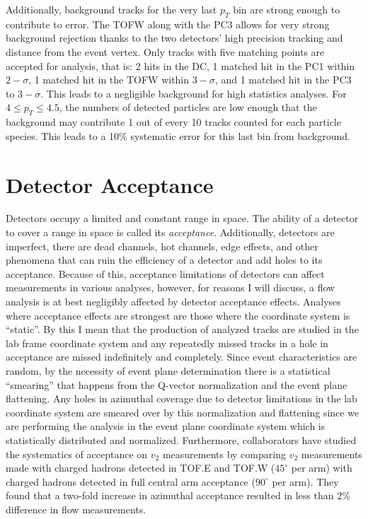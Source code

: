 Additionally, background tracks for the very last $p_T$ bin are strong enough to contribute to error. The TOFW along with the PC3 allows for very strong background rejection thanks to the two detectors' high precision tracking and distance from the event vertex. Only tracks with five matching points are accepted for analysis, that is: 2 hits in the DC, 1 matched hit in the PC1 within $2-\sigma$, 1 matched hit in the TOFW within $3-\sigma$, and 1 matched hit in the PC3 to $3-\sigma$. This leads to a negligible background for high statistics analyses. For $4\leq p_T \leq4.5$, the numbers of detected particles are low enough that the background may contribute 1 out of every 10 tracks counted for each particle species. This leads to a 10\% systematic error for this last bin from background.

\section{Detector Acceptance}
\label{sectaccepterr}
Detectors occupy a limited and constant range in space. The ability of a detector to cover a range in space is called its \textit{acceptance}. Additionally, detectors are imperfect, there are dead channels, hot channels, edge effects, and other phenomena that can ruin the efficiency of a detector and add holes to its acceptance. Because of this, acceptance limitations of detectors can affect measurements in various analyses, however, for reasons I will discuss, a flow analysis is at best negligibly affected by detector acceptance effects. Analyses where acceptance effects are strongest are those where the coordinate system is ``static''. By this I mean that the production of analyzed tracks are studied in the lab frame coordinate system and any repeatedly missed tracks in a hole in acceptance are missed indefinitely and completely. Since event characteristics are random, by the necessity of event plane determination there is a statistical ``smearing'' that happens from the Q-vector normalization and the event plane flattening. Any holes in azimuthal coverage due to detector limitations in the lab coordinate system are smeared over by this normalization and flattening since we are performing the analysis in the event plane coordinate system which is statistically distributed and normalized. Furthermore, collaborators have studied the systematics of acceptance on $v_2$ measurements\citep{azianisystematics} by comparing $v_2$ measurements made with charged hadrons detected in TOF.E and TOF.W ($45^{\circ}$ per arm) with charged hadrons detected in full central arm acceptance ($90^{\circ}$ per arm). They found that a two-fold increase in azimuthal acceptance resulted in less than 2\% difference in flow measurements. 

